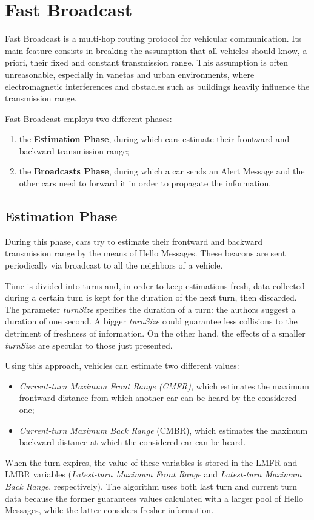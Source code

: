 
\chapter{Fast Broadcast}
	Fast Broadcast \cite{4199282} is a multi-hop routing protocol for vehicular communication. Its main feature consists in breaking the assumption that all vehicles should know, a priori, their fixed and constant transmission range. This assumption is often unreasonable, especially in \acrshort{vaneta}s and urban environments, where electromagnetic interferences and obstacles such as buildings heavily influence the transmission range.
	
	
	Fast Broadcast employs two different phases:
	\begin{enumerate}
		\item the \textbf{Estimation Phase}, during which cars estimate their frontward and backward transmission range;
		\item the \textbf{Broadcasts Phase}, during which a car sends an Alert Message and the other cars need to forward it in order to propagate the information.
	\end{enumerate}

	\section{Estimation Phase}
		During this phase, cars try to estimate their frontward and backward transmission range by the means of Hello Messages. These beacons are sent periodically via broadcast to all the neighbors of a vehicle.
		
		
		Time is divided into turns and, in order to keep estimations fresh, data collected during a certain turn is kept for the duration of the next turn, then discarded. The parameter \textit{turnSize} specifies the duration of a turn: the authors suggest a duration of one second. A bigger \textit{turnSize} could guarantee less collisions to the detriment of freshness of information. On the other hand, the effects of a smaller \textit{turnSize} are specular to those just presented. 
		
		
		Using this approach, vehicles can estimate two different values:
		\begin{itemize}
			\item \textit{Current-turn Maximum Front Range (CMFR)}, which estimates the maximum frontward distance from which another car can be heard by the considered one;
			\item \textit{Current-turn Maximum Back Range} (CMBR), which estimates the maximum backward distance at which the considered car can be heard.
		\end{itemize}
		When the turn expires, the value of these variables is stored in the LMFR and LMBR variables (\textit{Latest-turn Maximum Front Range} and \textit{Latest-turn Maximum Back Range}, respectively). The algorithm uses both last turn and current turn data because the former guarantees values calculated with a larger pool of Hello Messages, while the latter considers fresher information.
		
